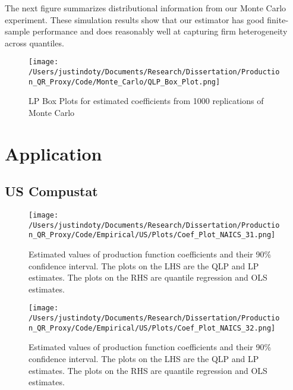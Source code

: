 \documentclass[11pt]{article}
\begin{document}
The next figure summarizes distributional information from our Monte Carlo experiment. These simulation results show that our estimator has good finite-sample performance and does reasonably well at capturing firm heterogeneity across quantiles.


\begin{figure}[H]
\centering
\caption{LP Box Plots for estimated coefficients from 1000 replications of Monte Carlo}
\texttt{[image: /Users/justindoty/Documents/Research/Dissertation/Production\_QR\_Proxy/Code/Monte\_Carlo/QLP\_Box\_Plot.png]}
\label{LP_Box Plot}
\end{figure}

\section{Application} \label{application}

\subsection{US Compustat}




\begin{figure}[H]
\centering
\texttt{[image: /Users/justindoty/Documents/Research/Dissertation/Production\_QR\_Proxy/Code/Empirical/US/Plots/Coef\_Plot\_NAICS\_31.png]}
\caption{Estimated values of production function coefficients and their 90\% confidence interval. The plots on the LHS are the QLP and LP estimates. The plots on the RHS are quantile regression and OLS estimates.}
\end{figure}

\begin{figure}[H]
\centering
\texttt{[image: /Users/justindoty/Documents/Research/Dissertation/Production\_QR\_Proxy/Code/Empirical/US/Plots/Coef\_Plot\_NAICS\_32.png]}
\caption{Estimated values of production function coefficients and their 90\% confidence interval. The plots on the LHS are the QLP and LP estimates. The plots on the RHS are quantile regression and OLS estimates.}
\end{figure}
\end{document}
